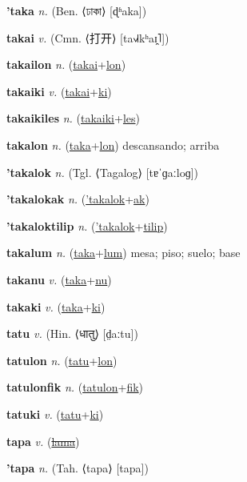\textbf{\hypertarget{'taka}{'taka}} \textit{n.} (Ben. ⟨{\bengali{}ঢাকা}⟩ [ɖʱaka])


\textbf{\hypertarget{takai}{takai}} \textit{v.} (Cmn. ⟨{\chinese{}打开}⟩ [ta˧˩˧kʰaɪ̯˥])


\textbf{\hypertarget{takailon}{takailon}} \textit{n.} (\hyperlink{takai}{takai}+\allowbreak \hyperlink{lon}{lon})


\textbf{\hypertarget{takaiki}{takaiki}} \textit{v.} (\hyperlink{takai}{takai}+\allowbreak \hyperlink{ki}{ki})


\textbf{\hypertarget{takaikiles}{takaikiles}} \textit{n.} (\hyperlink{takaiki}{takaiki}+\allowbreak \hyperlink{les}{les})


\textbf{\hypertarget{takalon}{takalon}} \textit{n.} (\hyperlink{taka}{taka}+\allowbreak \hyperlink{lon}{lon})
descansando; arriba

\textbf{\hypertarget{'takalok}{'takalok}} \textit{n.} (Tgl. ⟨Tagalog⟩ [tɐˈɡaːloɡ])


\textbf{\hypertarget{'takalokak}{'takalokak}} \textit{n.} (\hyperlink{'takalok}{'takalok}+\allowbreak \hyperlink{ak}{ak})


\textbf{\hypertarget{'takaloktilip}{'takaloktilip}} \textit{n.} (\hyperlink{'takalok}{'takalok}+\allowbreak \hyperlink{tilip}{tilip})


\textbf{\hypertarget{takalum}{takalum}} \textit{n.} (\hyperlink{taka}{taka}+\allowbreak \hyperlink{lum}{lum})
mesa; piso; suelo; base

\textbf{\hypertarget{takanu}{takanu}} \textit{v.} (\hyperlink{taka}{taka}+\allowbreak \hyperlink{nu}{nu})


\textbf{\hypertarget{takaki}{takaki}} \textit{v.} (\hyperlink{taka}{taka}+\allowbreak \hyperlink{ki}{ki})


\textbf{\hypertarget{tatu}{tatu}} \textit{v.} (Hin. ⟨{\devanagari{}धातु}⟩ [d̤aːtu])


\textbf{\hypertarget{tatulon}{tatulon}} \textit{n.} (\hyperlink{tatu}{tatu}+\allowbreak \hyperlink{lon}{lon})


\textbf{\hypertarget{tatulonfik}{tatulonfik}} \textit{n.} (\hyperlink{tatulon}{tatulon}+\allowbreak \hyperlink{fik}{fik})


\textbf{\hypertarget{tatuki}{tatuki}} \textit{v.} (\hyperlink{tatu}{tatu}+\allowbreak \hyperlink{ki}{ki})


\textbf{\hypertarget{tapa}{tapa}} \textit{v.} (\hyperlink{lama}{\sout{lama}})


\textbf{\hypertarget{'tapa}{'tapa}} \textit{n.} (Tah. ⟨tapa⟩ [tapa])


